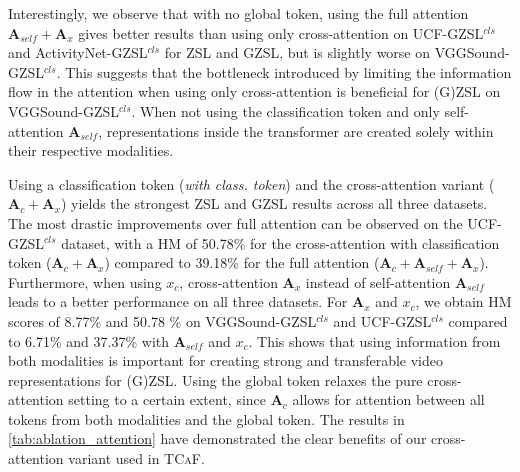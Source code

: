 \documentclass[runningheads]{llncs}
\newcommand{\modelName}{\textsc{TCaF}\xspace}
\newcommand{\activity}{{ActivityNet-GZSL$^{cls}$}\xspace}
\newcommand{\ucf}{{UCF-GZSL$^{cls}$}\xspace}
\newcommand{\vgg}{{VGGSound-GZSL$^{cls}$}\xspace}
\begin{document}
Interestingly, we observe that with no global token, using the full attention $\mathbf{A}_{self} + \mathbf{A}_{x}$ gives better results than using only cross-attention on \ucf and \activity for ZSL and GZSL, but is slightly worse on \vgg. This suggests that the bottleneck introduced by limiting the information flow in the attention when using only cross-attention is beneficial for (G)ZSL on \vgg.
When not using the classification token and only self-attention $\mathbf{A}_{self}$, representations inside the transformer are created solely within their respective modalities. 

Using a classification token (\textit{with class. token}) and the cross-attention variant ($\mathbf{A}_c + \mathbf{A}_{x}$) yields the strongest ZSL and GZSL results across all three datasets. The most drastic improvements over full attention can be observed on the \ucf dataset, with a HM of 50.78\% for the cross-attention with classification token ($\mathbf{A}_c + \mathbf{A}_{x}$) compared to 39.18\% for the full attention ($\mathbf{A}_c + \mathbf{A}_{self} + \mathbf{A}_{x}$).
Furthermore, when using $x_c$, cross-attention $\mathbf{A}_{x}$ instead of self-attention $\mathbf{A}_{self}$ leads to a better performance on all three datasets. For $\mathbf{A}_x$ and $x_c$, we obtain HM scores of 8.77\% and 50.78 \% on \vgg and \ucf compared to 6.71\% and 37.37\% with $\mathbf{A}_{self}$ and $x_c$. This shows that using information from both modalities is important for creating strong and transferable video representations for (G)ZSL.
Using the global token relaxes the pure cross-attention setting to a certain extent, since $\mathbf{A}_c$ allows for attention between all tokens from both modalities and the global token. The results in \cref{tab:ablation_attention} have demonstrated the clear benefits of our cross-attention variant used in \modelName.
\end{document}
